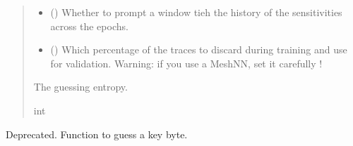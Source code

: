 \documentclass[letterpaper,10pt,english]{sphinxmanual}
\begin{document}
\begin{fulllineitems}
\begin{fulllineitems}
\begin{quote}
\begin{description}
\begin{itemize}
\item {} 
\sphinxAtStartPar
{} (\sphinxstyleliteralemphasis{\sphinxupquote{, }}) \textendash{} Whether to prompt a window tieh the history of the sensitivities across the epochs.

\item {} 
\sphinxAtStartPar
{} (\sphinxstyleliteralemphasis{\sphinxupquote{, }}) \textendash{} Which percentage of the traces to discard during training and use for validation.
Warning: if you use a MeshNN, set it carefully !

\end{itemize}

\sphinxAtStartPar
The guessing entropy.

\sphinxAtStartPar
int

\end{description}\end{quote}

\end{fulllineitems}


\begin{fulllineitems}
\label{\detokenize{MLSCAlib.Attacks:MLSCAlib.Attacks.unprofiled.UnProfiled.attack_byte_with_min_traces}}
\pysigstartsignatures
{}
\pysigstopsignatures
\sphinxAtStartPar
Deprecated. Function to guess a key byte.


\end{fulllineitems}
\end{fulllineitems}
\end{document}
